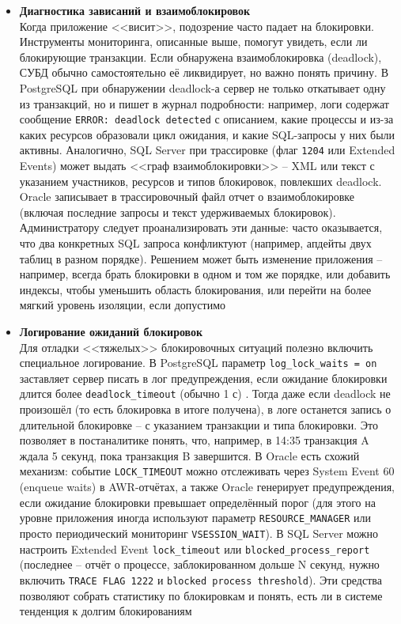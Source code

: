 \begin{itemize}
    \item \textbf{Диагностика зависаний и взаимоблокировок} ~\\
    Когда приложение <<висит>>, подозрение часто падает на блокировки. Инструменты мониторинга, описанные выше, помогут увидеть, если ли блокирующие транзакции. Если обнаружена взаимоблокировка (deadlock), СУБД обычно самостоятельно её ликвидирует, но важно понять причину. В PostgreSQL при обнаружении deadlock-а сервер не только откатывает одну из транзакций, но и пишет в журнал подробности: например, логи содержат сообщение \texttt{ERROR: deadlock detected} с описанием, какие процессы и из-за каких ресурсов образовали цикл ожидания, и какие SQL-запросы у них были активны. Аналогично, SQL Server при трассировке (флаг \texttt{1204} или Extended Events) может выдать <<граф взаимоблокировки>> – XML или текст с указанием участников, ресурсов и типов блокировок, повлекших deadlock. Oracle записывает в трассировочный файл отчет о взаимоблокировке (включая последние запросы и текст удерживаемых блокировок). Администратору следует проанализировать эти данные: часто оказывается, что два конкретных SQL запроса конфликтуют (например, апдейты двух таблиц в разном порядке). Решением может быть изменение приложения – например, всегда брать блокировки в одном и том же порядке, или добавить индексы, чтобы уменьшить область блокирования, или перейти на более мягкий уровень изоляции, если допустимо
    \item \textbf{Логирование ожиданий блокировок} ~\\
   Для отладки <<тяжелых>> блокировочных ситуаций полезно включить специальное логирование. В PostgreSQL параметр \texttt{log\_lock\_waits = on} заставляет сервер писать в лог предупреждения, если ожидание блокировки длится более \texttt{deadlock\_timeout} (обычно 1 с) \autocite{PostgreSQLdocc19}. Тогда даже если deadlock не произошёл (то есть блокировка в итоге получена), в логе останется запись о длительной блокировке – с указанием транзакции и типа блокировки. Это позволяет в постаналитике понять, что, например, в 14:35 транзакция A ждала 5 секунд, пока транзакция B завершится. В Oracle есть схожий механизм: событие \texttt{LOCK\_TIMEOUT} можно отслеживать через System Event 60 (enqueue waits) в AWR-отчётах, а также Oracle генерирует предупреждения, если ожидание блокировки превышает определённый порог (для этого на уровне приложения иногда используют параметр \texttt{RESOURCE\_MANAGER} или просто периодический мониторинг \texttt{V\textdollar SESSION\_WAIT}). В SQL Server можно настроить Extended Event \texttt{lock\_timeout} или \texttt{blocked\_process\_report} (последнее – отчёт о процессе, заблокированном дольше N секунд, нужно включить \texttt{TRACE FLAG 1222} и \texttt{blocked process threshold}). Эти средства позволяют собрать статистику по блокировкам и понять, есть ли в системе тенденция к долгим блокированиям 

\end{itemize}
